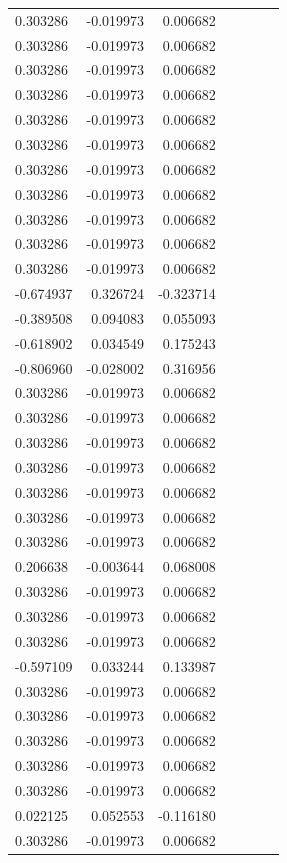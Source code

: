 \documentclass[a4paper,twoside,12pt]{book}
\begin{document}
\begin{appendices}
\begin{table}
\begin{tabular}{lrrrrrr}
	 0.303286 & -0.019973 &  0.006682 \\
	 0.303286 & -0.019973 &  0.006682 \\
	 0.303286 & -0.019973 &  0.006682 \\
	 0.303286 & -0.019973 &  0.006682 \\
	 0.303286 & -0.019973 &  0.006682 \\
	 0.303286 & -0.019973 &  0.006682 \\
	 0.303286 & -0.019973 &  0.006682 \\
	 0.303286 & -0.019973 &  0.006682 \\
	 0.303286 & -0.019973 &  0.006682 \\
	 0.303286 & -0.019973 &  0.006682 \\
	 0.303286 & -0.019973 &  0.006682 \\
	-0.674937 &  0.326724 & -0.323714 \\
	-0.389508 &  0.094083 &  0.055093 \\
	-0.618902 &  0.034549 &  0.175243 \\
	-0.806960 & -0.028002 &  0.316956 \\
	 0.303286 & -0.019973 &  0.006682 \\
	 0.303286 & -0.019973 &  0.006682 \\
	 0.303286 & -0.019973 &  0.006682 \\
	 0.303286 & -0.019973 &  0.006682 \\
	 0.303286 & -0.019973 &  0.006682 \\
	 0.303286 & -0.019973 &  0.006682 \\
	 0.303286 & -0.019973 &  0.006682 \\
	 0.206638 & -0.003644 &  0.068008 \\
	 0.303286 & -0.019973 &  0.006682 \\
	 0.303286 & -0.019973 &  0.006682 \\
	 0.303286 & -0.019973 &  0.006682 \\
	-0.597109 &  0.033244 &  0.133987 \\
	 0.303286 & -0.019973 &  0.006682 \\
	 0.303286 & -0.019973 &  0.006682 \\
	 0.303286 & -0.019973 &  0.006682 \\
	 0.303286 & -0.019973 &  0.006682 \\
	 0.303286 & -0.019973 &  0.006682 \\
	 0.022125 &  0.052553 & -0.116180 \\
	 0.303286 & -0.019973 &  0.006682 \\

\end{tabular}
\end{table}
\end{appendices}
\end{document}
